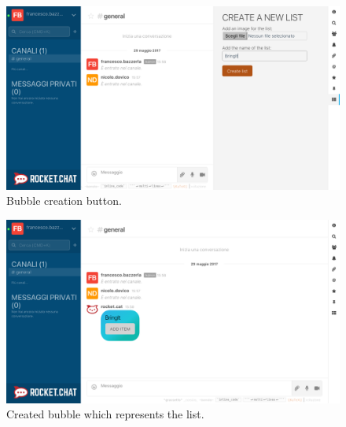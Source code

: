 \begin{figure}[H]
  \centering 
  \includegraphics[width=\textwidth]{Sections/3-HowToUse/Images/list_create_filled.png}
  \caption{Bubble creation button.}
\end{figure}

\begin{figure}[H]
  \centering 
  \includegraphics[width=\textwidth]{Sections/3-HowToUse/Images/bubble_empty.png}
  \caption{Created bubble which represents the list.}
\end{figure}